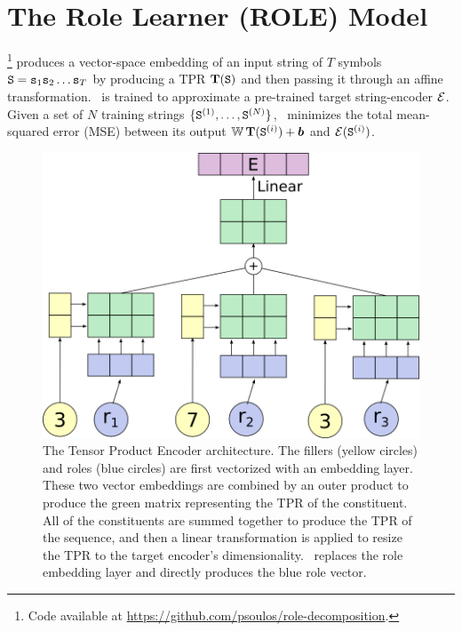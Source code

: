 \section{The Role Learner (ROLE) Model} \label{sec:rldn-Role-Learning} 

\RLN\footnote{Code available at \url{https://github.com/psoulos/role-decomposition}.} produces a vector-space embedding of an input string of $T$ symbols ${\mathtt{S}} = {\mathtt{s}}_1 {\mathtt{s}}_2 \ldots {\mathtt{s}}_T$ by producing a TPR ${\mathbf{T}}({\mathtt{S}})$ and then passing it through an affine transformation.
\RLN\ is trained to approximate a pre-trained target string-encoder ${\mathcal{E}}$.
Given a set of $N$ training strings $\{ {\mathtt{S}}^{(1)}, \ldots, {\mathtt{S}}^{(N)} \}$, \RLN\ minimizes the total mean-squared error (MSE) between its output ${\mathbb{W}}\,{\mathbf{T}}({\mathtt{S}}^{(i)}) + {\bm{b}}$ and %
${\mathcal{E}}({\mathtt{S}}^{(i)})$.

\begin{figure}[t]
    \centering
    \includegraphics[scale=.3]{images/rldn/tpdn.png}
    \caption{The Tensor Product Encoder architecture. The fillers (yellow circles) and roles (blue circles) are first vectorized with an embedding layer. These two vector embeddings are combined by an outer product to produce the green matrix representing the TPR of the constituent. All of the constituents are summed together to produce the TPR of the sequence, and then a linear transformation is applied to resize the TPR to the target encoder's dimensionality. \RLN\ replaces the role embedding layer and directly produces the blue role vector.}
    \label{fig:tpe-arch}
\end{figure}

